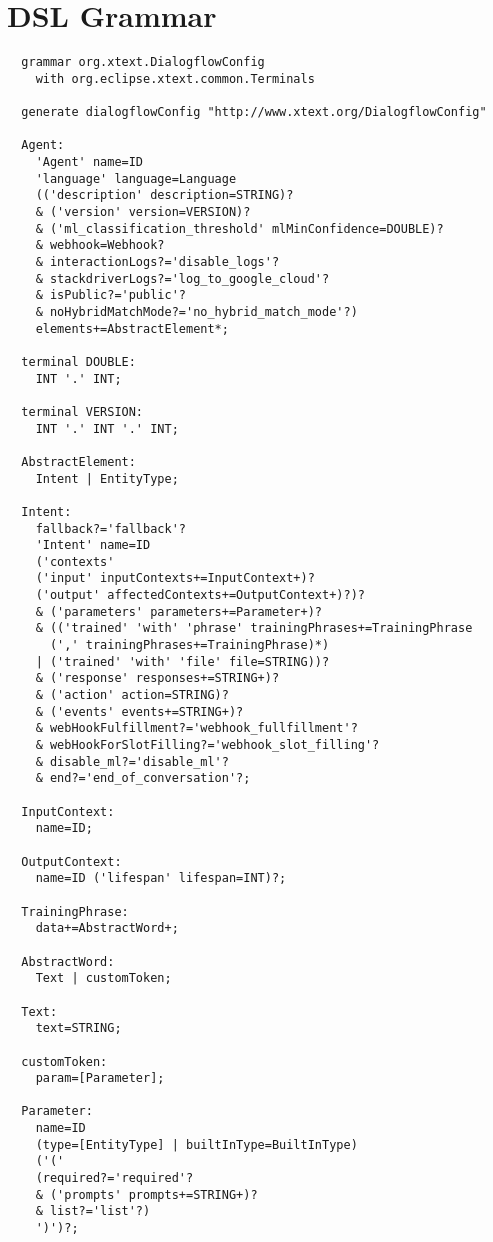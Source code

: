 \chapter{DSL Grammar}
\label{DSLGrammar}
\begin{lstlisting}
  grammar org.xtext.DialogflowConfig 
    with org.eclipse.xtext.common.Terminals

  generate dialogflowConfig "http://www.xtext.org/DialogflowConfig"
  
  Agent:
    'Agent' name=ID
    'language' language=Language
    (('description' description=STRING)?
    & ('version' version=VERSION)?
    & ('ml_classification_threshold' mlMinConfidence=DOUBLE)?
    & webhook=Webhook?
    & interactionLogs?='disable_logs'?
    & stackdriverLogs?='log_to_google_cloud'?
    & isPublic?='public'?
    & noHybridMatchMode?='no_hybrid_match_mode'?)
    elements+=AbstractElement*;
  
  terminal DOUBLE:
    INT '.' INT;
  
  terminal VERSION:
    INT '.' INT '.' INT;
  
  AbstractElement:
    Intent | EntityType;
  
  Intent:
    fallback?='fallback'?
    'Intent' name=ID
    ('contexts'
    ('input' inputContexts+=InputContext+)?
    ('output' affectedContexts+=OutputContext+)?)?
    & ('parameters' parameters+=Parameter+)?
    & (('trained' 'with' 'phrase' trainingPhrases+=TrainingPhrase 
      (',' trainingPhrases+=TrainingPhrase)*)
    | ('trained' 'with' 'file' file=STRING))?
    & ('response' responses+=STRING+)?
    & ('action' action=STRING)?
    & ('events' events+=STRING+)?
    & webHookFulfillment?='webhook_fullfillment'?
    & webHookForSlotFilling?='webhook_slot_filling'?
    & disable_ml?='disable_ml'?
    & end?='end_of_conversation'?;
  
  InputContext:
    name=ID;
  
  OutputContext:
    name=ID ('lifespan' lifespan=INT)?;
  
  TrainingPhrase:
    data+=AbstractWord+;
  
  AbstractWord:
    Text | customToken;
  
  Text:
    text=STRING;
  
  customToken:
    param=[Parameter];
  
  Parameter:
    name=ID
    (type=[EntityType] | builtInType=BuiltInType)
    ('('
    (required?='required'? 
    & ('prompts' prompts+=STRING+)? 
    & list?='list'?)
    ')')?;
  

\end{lstlisting}
